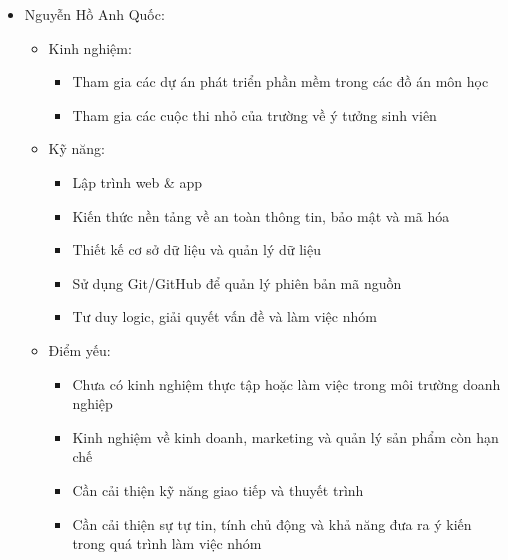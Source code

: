 \begin{itemize}
    \item Nguyễn Hồ Anh Quốc:
    \begin{itemize}
        \item Kinh nghiệm:
            \begin{itemize}
                \item Tham gia các dự án phát triển phần mềm trong các đồ án môn học
                \item Tham gia các cuộc thi nhỏ của trường về ý tưởng sinh viên
            \end{itemize}
        \item Kỹ năng:
            \begin{itemize}
                \item Lập trình web \& app
                \item Kiến thức nền tảng về an toàn thông tin, bảo mật và mã hóa
                \item Thiết kế cơ sở dữ liệu và quản lý dữ liệu
                \item Sử dụng Git/GitHub để quản lý phiên bản mã nguồn
                \item Tư duy logic, giải quyết vấn đề và làm việc nhóm
            \end{itemize}
        \item Điểm yếu:
            \begin{itemize}
                \item Chưa có kinh nghiệm thực tập hoặc làm việc trong môi trường doanh nghiệp
                \item Kinh nghiệm về kinh doanh, marketing và quản lý sản phẩm còn hạn chế
                \item Cần cải thiện kỹ năng giao tiếp và thuyết trình
                \item Cần cải thiện sự tự tin, tính chủ động và khả năng đưa ra ý kiến trong quá trình làm việc nhóm
            \end{itemize}
    \end{itemize}


\end{itemize}
